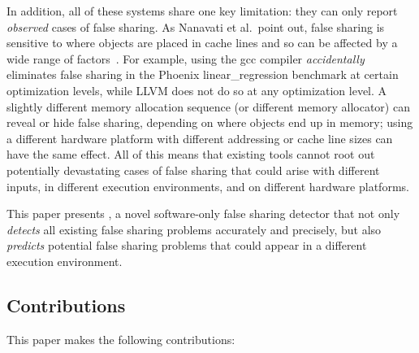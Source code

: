 In addition, all of these systems share one key limitation: they can
only report \emph{observed} cases of false sharing. As Nanavati et al.\ point out, false sharing is sensitive to where objects are
placed in cache lines and so can be affected by a wide range of
factors~\cite{OSdetection}. For example, using the gcc compiler
\emph{accidentally} eliminates false sharing in the Phoenix
linear\_regression benchmark at certain optimization levels, while
LLVM does not do so at any optimization level.  A slightly different memory
allocation sequence (or different memory allocator) can reveal or hide
false sharing, depending on where objects end up in memory; using a
different hardware platform with different addressing or cache line
sizes can have the same effect. All of this means that existing
tools cannot root out potentially devastating cases of false sharing
that could arise with different inputs, in different execution
environments, and on different hardware platforms.




This paper presents \Predator{}, a novel software-only false sharing
detector that not only \emph{detects} all existing false sharing
problems accurately and precisely, but also \emph{predicts} potential
false sharing problems that could appear in a  different execution
environment.

\subsection*{Contributions}

This paper makes the following contributions:

